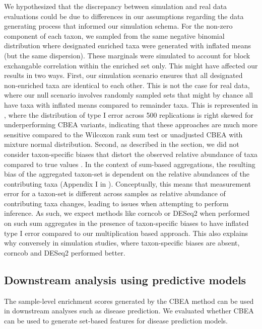 \documentclass[10pt,letterpaper]{article}
\begin{document}
We hypothesized that the discrepancy between simulation and real data evaluations could be due to differences in our assumptions regarding the data generating process that informed our simulation schema. For the non-zero component of each taxon, we sampled from the same negative binomial distribution where designated enriched taxa were generated with inflated means (but the same dispersion). These marginals were simulated to account for block exchangable correlation within the enriched set only. This might have affected our results in two ways. First, our simulation scenario ensures that all designated non-enriched taxa are identical to each other. This is not the case for real data, where our null scenario involves randomly sampled sets that might by chance all have taxa with inflated means compared to remainder taxa. This is represented in , where the distribution of type I error across 500 replications is right skewed for underperforming CBEA variants, indicating that these approaches are much more sensitive compared to the Wilcoxon rank sum test or unadjusted CBEA with mixture normal distribution. Second, as described in the  section, we did not consider taxon-specific biases that distort the observed relative abundance of taxa compared to true values \cite{mclaren2019}. In the context of sum-based aggregations, the resulting bias of the aggregated taxon-set is dependent on the relative abundances of the contributing taxa (Appendix I in \cite{mclaren2019}). Conceptually, this means that measurement error for a taxon-set is different across samples as relative abundance of contributing taxa changes, leading to issues when attempting to perform inference. As such, we expect methods like corncob or DESeq2 when performed on such sum aggregates in the presence of taxon-specific biases to have inflated type I error compared to our multiplication based approach. This also explains why conversely in simulation studies, where taxon-specific biases are absent, corncob and DESeq2 performed better. 

\subsection*{Downstream analysis using predictive models}
The sample-level enrichment scores generated by the CBEA method can be used in downstream analyses such as disease prediction. We evaluated whether CBEA can be used to generate set-based features for disease prediction models. 
\end{document}
